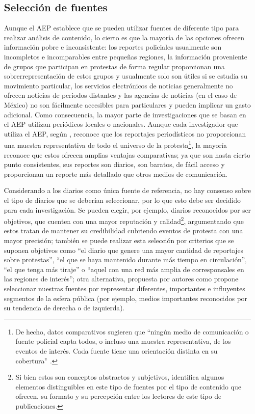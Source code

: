\documentclass[letterpaper, 11pt]{book}
\theoremstyle{definition}
\theoremstyle{remark}
\begin{document}
\subsection{Selección de fuentes}
\label{sec:AEP_seleccionFuentes}

Aunque el AEP establece que se pueden utilizar fuentes de diferente tipo para realizar análisis de contenido, lo cierto es que la mayoría de las opciones ofrecen información pobre e inconsistente: los reportes policiales usualmente son incompletos e incomparables entre pequeñas regiones, la información proveniente de grupos que participan en protestas de forma regular proporcionan una sobrerrepresentación de estos grupos y usualmente solo son útiles si se estudia su movimiento particular, los servicios electrónicos de noticias generalmente no ofrecen noticias de periodos distantes y las agencias de noticias (en el caso de México) no son fácilmente accesibles para particulares y pueden implicar un gasto adicional. 
Como consecuencia, la mayor parte de investigaciones que se basan en el AEP utilizan periódicos locales o nacionales. 
Aunque cada investigador que utiliza el AEP, según \citet{2002_Koopmans_AEP}, reconoce que los reportajes periodísticos no proporcionan una muestra representativa de todo el universo de la protesta\footnote{
    De hecho, datos comparativos sugieren que ``ningún medio de comunicación o fuente policial capta todos, o incluso una muestra representativa, de los eventos de interés. Cada fuente tiene una orientación distinta en su cobertura'' \citep[132]{2001_Maney_Oliver__FindingEvents}.
}, 
la mayoría reconoce que estos ofrecen amplias ventajas comparativas; ya que son hasta cierto punto consistentes, sus reportes son diarios, son baratos, de fácil acceso y proporcionan un reporte más detallado que otros medios de comunicación.

Considerando a los diarios como única fuente de referencia, no hay consenso sobre el tipo de diarios que se deberían seleccionar, por lo que esto debe ser decidido para cada investigación. 
Se pueden elegir, por ejemplo, diarios reconocidos por ser objetivos, que cuenten con una mayor reputación y calidad\footnote{Si bien estos son conceptos abstractos y subjetivos, \citet{1996_MorenoDeAlba_Prestigio} identifica algunos elementos distinguibles en este tipo de fuentes por el tipo de contenido que ofrecen, su formato y su percepción entre los lectores de este tipo de publicaciones.}, argumentando que estos tratan de mantener su credibilidad cubriendo eventos de protesta con una mayor precisión; también se puede realizar esta selección por criterios que se suponen objetivos como ``el diario que genere una mayor cantidad de reportajes sobre protestas'', ``el que se haya mantenido durante más tiempo en circulación'', ``el que tenga más tiraje'' o ``aquel con una red más amplia de corresponsales en las regiones de interés''; otra alternativa, propuesta por autores como \citet{2003_Wada_Tesis} propone seleccionar nuestras fuentes por representar diferentes, importantes e influyentes segmentos de la esfera pública (por ejemplo, medios importantes reconocidos por su tendencia de derecha o de izquierda).
\end{document}
